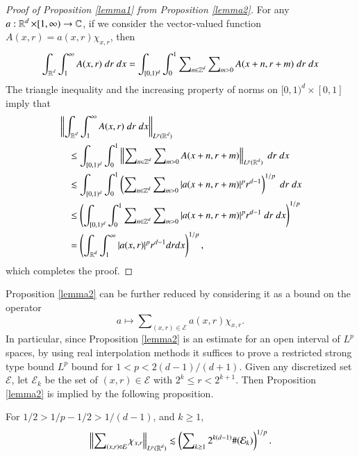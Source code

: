 \begin{proof}[Proof of Proposition \ref{lemma1} from Proposition \ref{lemma2}]
    For any $a: \operatorname{\mathbb{R}}^d \times [1,\infty) \to \operatorname{\mathbb{C}}$, if we consider the vector-valued function $A(x,r) = a(x,r) \chi_{x,r}$, then
    \begin{equation}
      \int_{\operatorname{\mathbb{R}}^d} \int_1^\infty A(x,r)\; dr\; dx = \int_{[0,1)^d} \int_0^1 \sum\nolimits_{n \in \operatorname{\mathbb{Z}}^d} \sum\nolimits_{m > 0} A(x + n,r + m)\; dr\; dx
    \end{equation}
    The triangle inequality and the increasing property of norms on $[0,1)^d \times [0,1]$ imply that
    \begin{equation}
    \begin{split}
    &\left\| \int_{\operatorname{\mathbb{R}}^d} \int_1^\infty A(x,r)\; dr\; dx \right\|_{L^p(\operatorname{\mathbb{R}}^d)}\\
    &\quad \leq \int_{[0,1)^d} \int_0^1 \left\| \sum\nolimits_{n \in \operatorname{\mathbb{Z}}^d} \sum\nolimits_{m > 0} A(x + n,r + m) \right\|_{L^p(\operatorname{\mathbb{R}}^d)}\; dr\; dx\\
    &\quad \lesssim \int_{[0,1)^d} \int_0^1 \left( \sum\nolimits_{n \in \operatorname{\mathbb{Z}}^d} \sum\nolimits_{m > 0} |a(x + n, r + m)|^p r^{d-1} \right)^{1/p}\; dr\; dx\\
    &\quad \leq \left( \int_{[0,1)^d} \int_0^1 \sum\nolimits_{n \in \operatorname{\mathbb{Z}}^d} \sum\nolimits_{m > 0} |a(x + n, r + m)|^p r^{d-1}\; dr\; dx \right)^{1/p}\\
    &\quad = \left( \int_{\operatorname{\mathbb{R}}^d} \int_1^\infty |a(x,r)|^p r^{d-1} dr dx \right)^{1/p},
    \end{split}
    \end{equation}
    which completes the proof.
\end{proof}

Proposition \ref{lemma2} can be further reduced by considering it as a bound on the operator
%
\begin{equation}
  a \mapsto \sum\nolimits_{(x,r) \in \mathcal{E}} a(x,r) \chi_{x,r}.
\end{equation}
%
In particular, since Proposition \ref{lemma2} is an estimate for an open interval of $L^p$ spaces, by using real interpolation methods it suffices to prove a restricted strong type bound $L^p$ bound for $1 < p < 2(d-1)/(d+1)$. Given any discretized set $\mathcal{E}$, let $\mathcal{E}_k$ be the set of $(x,r) \in \mathcal{E}$ with $2^k \leq r < 2^{k+1}$. Then Proposition \ref{lemma2} is implied by the following proposition.

\begin{prop} \label{lemma3}
    For $1/2 > 1/p - 1/2 > 1/(d-1)$, and $k \geq 1$,
    \[ \left\| \sum\nolimits_{(x,r) \in \mathcal{E}} \chi_{x,r} \right\|_{L^p(\operatorname{\mathbb{R}}^d)} \lesssim \left( \sum\nolimits_{k \geq 1} 2^{k(d-1)} \#(\mathcal{E}_k) \right)^{1/p}. \]
\end{prop}

